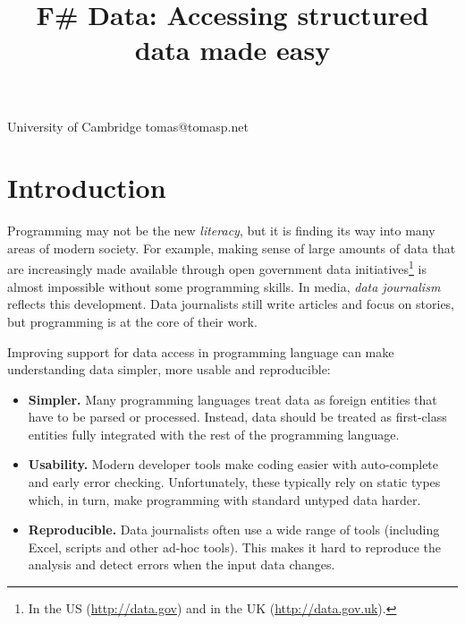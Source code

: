 \documentclass[preprint]{sigplanconf}
\begin{document}
\setlength{\pdfpageheight}{\paperheight}
\setlength{\pdfpagewidth}{\paperwidth}


\title{F\# Data: \textnormal{Accessing structured data made easy}}

           {University of Cambridge}
           {tomas@tomasp.net}
\maketitle


\section{Introduction}

Programming may not be the new \emph{literacy}, but it is finding its way into many areas
of modern society. For example, making sense of large amounts of data that are increasingly made
available through open government data initiatives\footnote{In the US (\url{http://data.gov}) and
in the UK (\url{http://data.gov.uk}).} is almost impossible without some programming skills.
In media, \emph{data journalism} reflects this development. Data journalists still write articles
and focus on stories, but programming is at the core of their work.

Improving support for data access in programming language can make understanding data simpler,
more usable and reproducible:

\begin{itemize}
  \item \textbf{Simpler.} Many programming languages treat data as foreign entities that have to
    be parsed or processed. Instead, data should be treated as first-class entities fully integrated
    with the rest of the programming language.
  \item \textbf{Usability.} Modern developer tools make coding easier with auto-complete and early
    error checking. Unfortunately, these typically rely on static types which, in turn, make
    programming with standard untyped data harder.
  \item \textbf{Reproducible.} Data journalists often use a wide range of tools (including Excel,
    scripts and other ad-hoc tools). This makes it hard to reproduce the analysis and detect
    errors when the input data changes.
\end{itemize}
\end{document}
